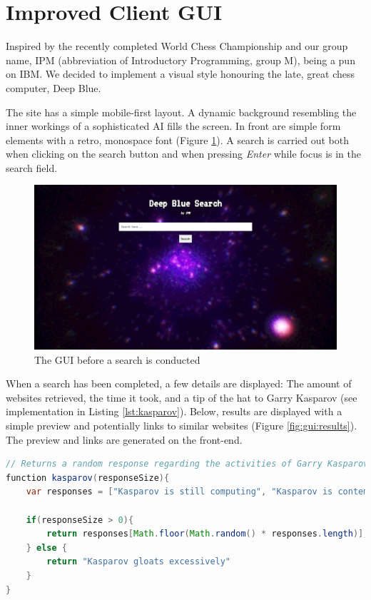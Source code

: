 \section{Improved Client GUI}
Inspired by the recently completed World Chess Championship and our group name, IPM (abbreviation of Introductory Programming, group M), being a pun on IBM. We decided to implement a visual style honouring the late, great chess computer, Deep Blue.

The site has a simple mobile-first layout. A dynamic background resembling the inner workings of a sophisticated AI fills the screen. In front are simple form elements with a retro, monospace font (Figure \ref{fig:gui:noResults}). A search is carried out both when clicking on the search button and when pressing \textit{Enter} while focus is in the search field. 

\begin{figure} [h]
	\centering
	\includegraphics[width=\textwidth]{graphics/gui-noResults.png}
	\caption{The GUI before a search is conducted}
	\label{fig:gui:noResults}
\end{figure}

When a search has been completed, a few details are displayed: The amount of websites retrieved, the time it took, and a tip of the hat to Garry Kasparov (see implementation in Listing \ref{lst:kasparov}). Below, results are displayed with a simple preview and potentially links to similar websites (Figure \ref{fig:gui:results}). The preview and links are generated on the front-end.

\begin{lstlisting}[language=Java,
	caption={The Kasparov Algorithm},
	label={lst:kasparov}]
// Returns a random response regarding the activities of Garry Kasparov
function kasparov(responseSize){
	var responses = ["Kasparov is still computing", "Kasparov is contemplating e4", "Kasparov retrieved none", "Kasparov regrets the Sicilian Defense"];

	if(responseSize > 0){
		return responses[Math.floor(Math.random() * responses.length)];
	} else {
		return "Kasparov gloats excessively"
	}
}
\end{lstlisting}

